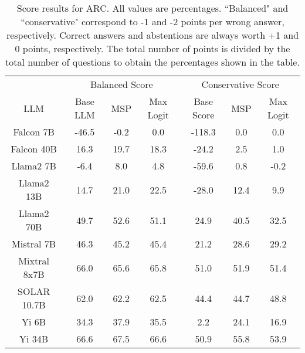 \renewcommand\arraystretch{1.2}
\begin{table*}
\centering
\begin{tabular}{c|c|c|c|c|c|c}
& \multicolumn{3}{c|}{Balanced Score} & \multicolumn{3}{c}{Conservative Score} \\ 
LLM & Base LLM & MSP & Max Logit & Base Score & MSP & Max Logit\\ \hline
Falcon 7B & -46.5 & -0.2 & 0.0 & -118.3 & 0.0 & 0.0\\
Falcon 40B & 16.3 & 19.7 & 18.3 & -24.2 & 2.5 & 1.0\\
Llama2 7B & -6.4 & 8.0 & 4.8 & -59.6 & 0.8 & -0.2\\
Llama2 13B & 14.7 & 21.0 & 22.5 & -28.0 & 12.4 & 9.9\\
Llama2 70B & 49.7 & 52.6 & 51.1 & 24.9 & 40.5 & 32.5\\
Mistral 7B & 46.3 & 45.2 & 45.4 & 21.2 & 28.6 & 29.2\\
Mixtral 8x7B & 66.0 & 65.6 & 65.8 & 51.0 & 51.9 & 51.4\\
SOLAR 10.7B & 62.0 & 62.2 & 62.5 & 44.4 & 44.7 & 48.8\\
Yi 6B & 34.3 & 37.9 & 35.5 & 2.2 & 24.1 & 16.9\\
Yi 34B & 66.6 & 67.5 & 66.6 & 50.9 & 55.8 & 53.9\\
\hline
\end{tabular}
\caption{Score results for ARC. All values are percentages. ``Balanced" and ``conservative" correspond to -1 and -2 points per wrong answer, respectively. Correct answers and abstentions are always worth +1 and 0 points, respectively. The total number of points is divided by the total number of questions to obtain the percentages shown in the table.}
\label{tab:arc_score}
\end{table*}
